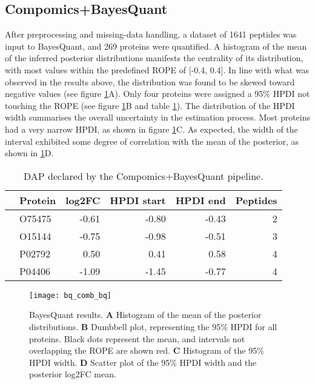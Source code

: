\subsection{Compomics+BayesQuant}

After preprocessing and missing-data handling, a dataset of 1641 peptides was input to BayesQuant, and 269 proteins were quantified. A histogram of the mean of the inferred posterior distributions manifests the centrality of its distribution, with most values within the predefined \ac{ROPE} of [-0.4, 0.4]. In line with what was observed in the results above, the distribution was found to be skewed toward negative values (see figure \ref{fig:compomics_bq}A). Only four proteins were assigned a 95\% \ac{HPDI} not touching the \ac{ROPE} (see figure \ref{fig:compomics_bq}B and table \ref{tab:thp1_bq_results}). The distribution of the \ac{HPDI} width summarises the overall uncertainty in the estimation process. Most proteins had a very narrow HPDI, as shown in figure \ref{fig:compomics_bq}C. As expected, the width of the interval exhibited some degree of correlation with   the mean of the posterior, as shown in \ref{fig:compomics_bq}D.

\begin{table}[!h]
\centering
\begin{tabular}{rlrrrr}
  \hline
 & Protein & log2FC & HPDI start & HPDI end & Peptides \\ 
  \hline
& O75475 & -0.61 & -0.80 & -0.43 & 2 \\ 
   & O15144 & -0.75 & -0.98 & -0.51 & 3 \\ 
   & P02792 & 0.50 & 0.41 & 0.58 & 4 \\ 
   & P04406 & -1.09 & -1.45 & -0.77 & 4 \\ 
   \hline
\end{tabular}
\caption{\ac{DAP} declared by the Compomics+BayesQuant pipeline.}
\label{tab:thp1_bq_results}
\end{table}


\begin{figure}[H]
\centering
\texttt{[image: bq\_comb\_bq]}
\caption[Compomics+BayesQuant results on the THP-1 dataset]{BayesQuant results. \textbf{A} Histogram of the mean of the posterior distributions. \textbf{B} Dumbbell plot, representing the 95\% \ac{HPDI} for all proteins. Black dots represent the mean, and intervals not overlapping the \ac{ROPE} are shown red. \textbf{C} Histogram of the 95\% \ac{HPDI} width. \textbf{D} Scatter plot of the 95\% \ac{HPDI} width and the  posterior \ac{log2FC} mean.}
\label{fig:compomics_bq}
\end{figure}


